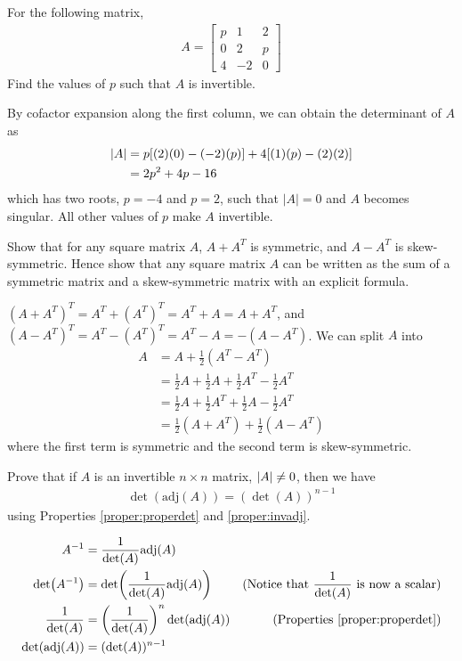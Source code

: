 \begin{Exercise}
For the following matrix,
\begin{align*}
A = 
\begin{bmatrix}
p & 1 & 2\\
0 & 2 & p\\
4 & -2 & 0
\end{bmatrix} 
\end{align*}
Find the values of $p$ such that $A$ is invertible.
\end{Exercise}
\begin{Answer}
By cofactor expansion along the first column, we can obtain the determinant of $A$ as
\begin{align*}
\abs{A} &= p[(2)(0)-(-2)(p)] + 4[(1)(p)-(2)(2)]\\
&= 2p^2 + 4p - 16
\end{align*}
which has two roots, $p = -4$ and $p = 2$, such that $|A| = 0$ and $A$ becomes singular. All other values of $p$ make $A$ invertible.
\end{Answer}

\begin{Exercise}
\label{ex:symskew}
Show that for any square matrix $A$, $A + A^T$ is symmetric, and $A - A^T$ is skew-symmetric. Hence show that any square matrix $A$ can be written as the sum of a symmetric matrix and a skew-symmetric matrix with an explicit formula.
\end{Exercise}
\begin{Answer}
$(A + A^T)^T = A^T + (A^T)^T = A^T+A = A+A^T$, and\\
$(A - A^T)^T = A^T - (A^T)^T = A^T-A = -(A - A^T)$. We can split $A$ into
\begin{align*}
A &= A + \frac{1}{2}(A^T - A^T) \\
&= \frac{1}{2}A + \frac{1}{2}A + \frac{1}{2}A^T - \frac{1}{2}A^T \\
&= \frac{1}{2}A + \frac{1}{2}A^T + \frac{1}{2}A - \frac{1}{2}A^T \\
&= \frac{1}{2}(A + A^T) + \frac{1}{2}(A - A^T)
\end{align*}
where the first term is symmetric and the second term is skew-symmetric.
\end{Answer}

\begin{Exercise}
Prove that if $A$ is an invertible $n \times n$ matrix, $\abs{A} \neq 0$, then we have
\begin{align*}
\det(\text{adj}(A))=(\det(A))^{n-1}    
\end{align*}
using Properties \ref{proper:properdet} and \ref{proper:invadj}.
\end{Exercise}
\begin{Answer}
\begin{align*}
A^{-1} &= \frac{1}{\det(A)}\text{adj}(A) \\
\det(A^{-1}) &= \det(\frac{1}{\det(A)}\text{adj}(A)) & \text{(Notice that $\frac{1}{\det(A)}$ is now a scalar)}\\
\frac{1}{\det(A)} &= \left(\frac{1}{\det(A)}\right)^n\det(\text{adj}(A)) &\text{(Properties \ref{proper:properdet})} \\
\det(\text{adj}(A)) &= (\det(A))^{n-1}  
\end{align*}
\end{Answer}
